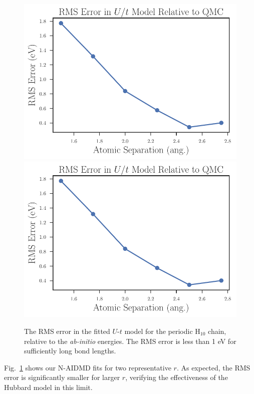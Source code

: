 \begin{figure}
\centering
\includegraphics[scale=0.5]{./Figures/rms_ut_error_vs_separation_h_chain.pdf}
\includegraphics[scale=0.5]{./Figures/rms_ut_error_vs_separation_h_chain.pdf}
\caption{The RMS error in the fitted $U$-$t$ model for the periodic H$_{10}$ chain, relative to the \textit{ab-initio} energies. The RMS error is less than 1 eV for sufficiently long bond lengths.}\label{fig:fit_quality}
\end{figure}
Fig.~\ref{fig:fit_quality} shows our N-AIDMD fits for two representative $r$. As expected, the RMS error 
is significantly smaller for larger $r$, verifying the effectiveness of the Hubbard model 
in this limit. 

